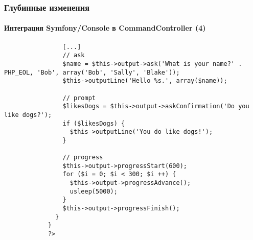 
\begin{frame}[fragile]
	\frametitle{Глубинные изменения}
	\framesubtitle{Интеграция Symfony/Console в CommandController (4)}

	\lstset{basicstyle=\tiny\ttfamily}

		\begin{lstlisting}
			    [...]
			    // ask
			    $name = $this->output->ask('What is your name?' . PHP_EOL, 'Bob', array('Bob', 'Sally', 'Blake'));
			    $this->outputLine('Hello %s.', array($name));

			    // prompt
			    $likesDogs = $this->output->askConfirmation('Do you like dogs?');
			    if ($likesDogs) {
			      $this->outputLine('You do like dogs!');
			    }

			    // progress
			    $this->output->progressStart(600);
			    for ($i = 0; $i < 300; $i ++) {
			      $this->output->progressAdvance();
			      usleep(5000);
			    }
			    $this->output->progressFinish();
			  }
			}
			?>
		\end{lstlisting}

\end{frame}


